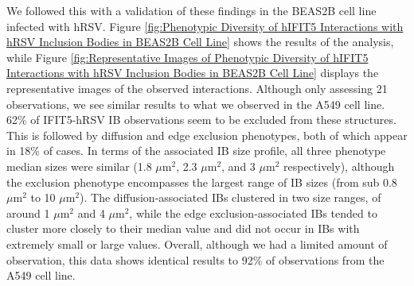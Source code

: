 We followed this with a validation of these findings in the BEAS2B cell line infected with hRSV. Figure \ref{fig:Phenotypic Diversity of hIFIT5 Interactions with hRSV Inclusion Bodies in BEAS2B Cell Line} shows the results of the analysis, while Figure \ref{fig:Representative Images of Phenotypic Diversity of hIFIT5 Interactions with hRSV Inclusion Bodies in BEAS2B Cell Line} displays the representative images of the observed interactions. Although only assessing 21 observations, we see similar results to what we observed in the A549 cell line. 62\% of IFIT5-hRSV IB observations seem to be excluded from these structures. This is followed by diffusion and edge exclusion phenotypes, both of which appear in 18\% of cases. In terms of the associated IB size profile, all three phenotype median sizes were similar (1.8 \(\mu \mbox{m}^2\), 2.3 \(\mu \mbox{m}^2\), and 3 \(\mu \mbox{m}^2\) respectively), although the exclusion phenotype encompasses the largest range of IB sizes (from sub 0.8 \(\mu \mbox{m}^2\) to 10 \(\mu \mbox{m}^2\)). The diffusion-associated IBs clustered in two size ranges, of around 1 \(\mu \mbox{m}^2\) and 4 \(\mu \mbox{m}^2\), while the edge exclusion-associated IBs tended to cluster more closely to their median value and did not occur in IBs with extremely small or large values. Overall, although we had a limited amount of observation, this data shows identical results to 92\% of observations from the A549 cell line.

